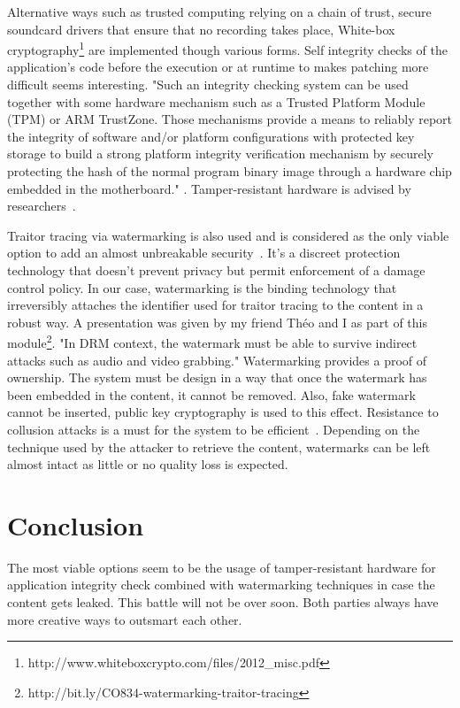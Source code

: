 \documentclass[11pt, twocolumn]{article}
\begin{document}
Alternative ways such as trusted computing relying on a chain of trust, secure soundcard drivers that ensure that no recording takes place, White-box cryptography\footnote{http://www.whiteboxcrypto.com/files/2012\_misc.pdf} are implemented though various forms.
Self integrity checks of the application's code before the execution or at runtime to makes patching more difficult seems interesting.
"Such an integrity checking system can be used together with some hardware mechanism such as a Trusted Platform Module (TPM) or ARM TrustZone. Those mechanisms provide a means to reliably report the integrity of software and/or platform configurations with protected key storage to build a strong platform integrity verification mechanism by securely protecting the hash of the normal program binary image through a hardware chip embedded in the motherboard." \cite{Choi:2016}.
Tamper-resistant hardware is advised by researchers~\cite{Stamp:2003}.

Traitor tracing via watermarking is also used and is considered as the only viable option to add an almost unbreakable security~\cite{Hauser:2003}.
It's a discreet protection technology that doesn't prevent privacy but permit enforcement of a damage control policy.
In our case, watermarking is the binding technology that irreversibly attaches the identifier used for traitor tracing to the content in a robust way.
A presentation was given by my friend Théo and I as part of this module\footnote{http://bit.ly/CO834-watermarking-traitor-tracing}.
"In DRM context, the watermark must be able to survive indirect attacks such as audio and video grabbing."\cite{Ku:2004}
Watermarking provides a proof of ownership.
The system must be design in a way that once the watermark has been embedded in the content, it cannot be removed.
Also, fake watermark cannot be inserted, public key cryptography is used to this effect.
Resistance to collusion attacks is a must for the system to be efficient~\cite{Doerr:2010}.
Depending on the technique used by the attacker to retrieve the content, watermarks can be left almost intact as little or no quality loss is expected.

\section{Conclusion}

The most viable options seem to be the usage of tamper-resistant hardware for application integrity check combined with watermarking techniques in case the content gets leaked.
This battle will not be over soon.
Both parties always have more creative ways to outsmart each other.




\end{document}
